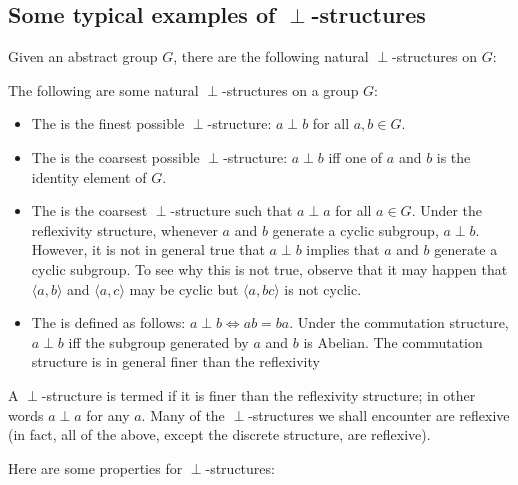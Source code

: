 \documentclass[a4paper]{amsart}
\begin{document}
\subsection{Some typical examples of $\perp$-structures}

Given an abstract group $G$, there are the following natural
$\perp$-structures on $G$:

\begin{definer}
  The following are some natural $\perp$-structures on a group $G$:

  \begin{itemize}

  \item The  is the finest possible
    $\perp$-structure: $a \perp b$ for all $a,b \in G$.

  \item The  is the coarsest possible
    $\perp$-structure: $a \perp b$ iff one of $a$ and $b$ is the
    identity element of $G$.

  \item The  is the coarsest
    $\perp$-structure such that $a \perp a $ for all $a \in G$.  Under
    the reflexivity structure, whenever $a$ and $b$ generate a cyclic
    subgroup, $a \perp b$. However, it is not in general true that $a
    \perp b$ implies that $a$ and $b$ generate a cyclic subgroup. To
    see why this is not true, observe that it may happen that $\langle
    a , b \rangle$ and $\langle a, c\rangle$ may be cyclic but
    $\langle a, bc \rangle$ is not cyclic.

  \item The  is defined as follows:
    $a \perp b \iff ab = ba$. Under the commutation structure, $a
    \perp b$ iff the subgroup generated by $a$ and $b$ is Abelian.
    The commutation structure is in general finer than the reflexivity

  \end{itemize}
\end{definer}

A $\perp$-structure is termed
 if it is finer than the
reflexivity structure; in other words $a \perp a$ for any $a$. Many of
the $\perp$-structures we shall encounter are reflexive (in fact, all
of the above, except the discrete structure, are reflexive).

Here are some properties for $\perp$-structures:
\end{document}
